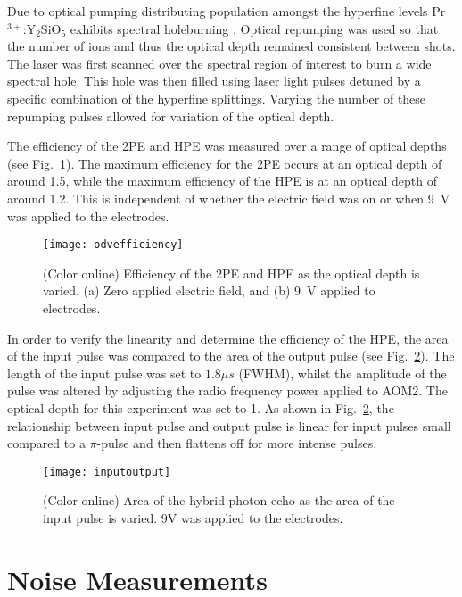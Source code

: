                                                                                                                                                                                                                                                                                                                                                                                                                                                                                                                                                                                                                                                                                                                                                                                                                                                                                                                                                                                                                                                                                                                                                                                                                                                                                                                                                                                                                                                                                                                                                                                                                                                                                                                                                                                                                                                                                                                                                                                                                                                                                                                                                                                                                                                                                                                                                                                                                                                                                                                                                                                                                                                                                                                                                                                                                                                                                                                                                                                                                                                                                                                                                                                                                                                                                                                                                                                                                                                                                                                                                                                                                                                                                                                                                                                                                                                                                                                                                                                                                                                                                                                                                                                                                                                                                                                                                                                                                                                                                                                                                                                                                                                                                                                                                                                                                                                                                                                                                                                                                                                                                                                                                                                                                                                                                                                                                                                                                                                                                                                                                                                                                                                                                                                                                                                                                                                                                                                                                                                                                                                                                                                                                                                                                                                                                                                                                                                                                                                                                                                                                                                                                                                                                                                                                                                                                                                                                                                                                                                                                                                                                                                                                                                                                                                                                                                                                                                                                                                                                                                                                                                                                                                                                                                                                                                                                                                                                                                                                                                                                                                                                                                                                                                                                                                                                                                                                                                                                                                                                                                                                                                                                                                                                                                                                                                                                                                                                                                                                                                                                                                                                                                                                                                                                                                                                                                                                                                                                                                                                                                                                                                                                                                                                                                                                                                                                                                                                                                                                                                                                                                                                                                                                                                                                                                                                                                                                                                                                                                                                                                                                                                                                                                                                                                                                                                                                                                                                                                                                                                                                                                                                                                                                                                                                                                                                                                                                                                                                                                                                                                                                                                                                                                                                                                                                                                                                                                                                                                                                                                                                                                                                                                                                                                                                                                                                                                                                                                                                                                                                                                                                                                                                                                                                                                                                                                                                                                                                                                                                                                                                                                                                                                                                                                                                                                                                                                                                                                                                                                                                                                                                                                                                                                                                                                                                                                                                                                                                                                                                                                                                                                                                                                                                                                                                                                                                                                                                                                                                                                                                                                                                                                                                                                                                                                                                                                                                                                                                                                                                                                                                                                                                                                                                                                                                                                                                                                                                                                                                                                                                                                                                                                                                                                                                                                                                                                                                                                                                                                                                                                                                                                                                                                                                                                                                                                                                                                                                                                                                                                                                                                                                                                                                                                                                                                                                                                                                                                                                                                                                                                                                                                                                                                                                                                                                                                                                                                                                                                                                                                                                                                                                                                                                                                                                                                                                                                                                                                                                                                                                                                                                                                                                                                                                                                                                                                                                                                                                                                                                                                                                                                                                                                                                                                                                                                                                                                                                                                                                                                                                                                                                                                                                                                                                                                                                                                                                                                                                                                                                                                                                                                                                                                                                                                                                                                                                                                                                                                                                                                                                                                                                                                                                                                                                                                                                                                                                                                                                                                                                                                                                                                                                                                                                                                                                                                                                                                                                                                                                                                                                                                                                                                                                                                                                                                                                                                                                                                                                                                                                                                                                                                                                                                                                                                                                                                                                                                                                                                                                                                                                                                                                                                                                                                                                                                                                                                                                                                                                                                                                                                                                                                                                                                                                                                                                                                                                                                                                                                                                                                                                                                                                                                                                                                                                                                                                                                                                                                                                                                                                                                                                                                                                                                                                                                                                                                                                                                                                                                                                                                                                                                                                                                                                                                                                                                                                                                                                                                                                                                                                                                                                                                                                                                                                                                                                                                                                                                                                                                                                                                                                                                                                                                                                                                                                                                                                                                                                                                                                                                                                                                                                                                                                                                                                                                                                                                                                                                                                                                                                                                                                                                                                                                                                                                                                                                                                                                                                                                                                                                                                                                                                                                                                                                                                                                                                                                                                                                                                                                                                                                                                                                                                                                                                                                                                                                                                                                                                                                                                                                                                                                                                                                                                                                                                                                                                                                                                                                                                                                                                                                                                                                                                                                                                                                                                                                                                                                                                                                                                                                                                                                                                                                                                                                                                                                                                                                                                                                                                                                                                                                                                                                                                                                                                                                                                                                                                                                                                                                                                                                                                                                                                                                                                                                                                                                                                                                                                                                                                                                                                                                                                                                                                                                                                                                                                                                                                                                                                                                                                                                                                                                                                                                                                                                                                                                                                                                                                                                                                                                                                                                                                                                                                                                                                                                                                                                                                                                                                                                                                                                                                                                                                                                                                                                                                                                                                                                                                                                                                                                                                                                                                                                                                                                                                                                                                                                                                                                                                                                                                                                                                                                                                                                                                                                                                                                                                                                                                                                                                                                                                                                                                                                                                                                                                                                                                                                                                                                                                                                                                                                                                                                                                                                                                                                                                                                                                                                                                                                                                                                                                                                                                                                                                                                                                                                                                                                                                                                                                                                                                                                                                                                                                                                                                                                                                                                                                                                                                                                                                                                                                                                                                                                                                                                                                                                                                                                                                                                                                                                                                                                                                                                                                                                                                                                                                                                                                                                                                                                                                                                                                                                                                                                                                                                                                                                                                                                                                                                                                                                                                                                                                                                                                                                                                                                                                                                                                                                                                                                                                                                                                                                                                                                                                                                                                                                                                                                                                                                                                                                                                                                                                                                                                                                                                                                                                                                                                                                                                                                                                                                                                                                                                                                                                                                                                                                                                                                                                                                                                                                                                                                                                                                                                                                                                                                                                                                                                                                                                                                                                                                                                                                                                                                                                                                                                                                                                                                                                                                                                                                                                                                                                                                                                                                                                                                                                                                                                                                                                                                                                                                                                                                                                                                                                                                                                                                                                                                                                                                                                                                                                                                                                                                                                                                                                                                                                                                                                                                                                                                                                                                                                                                                                                                                                                                                                                                                                                                                                                                                                                                                                                                                                                                                                                                                                                                                                                                                                                                                                                                                                                                                                                                                                                                                                                                                                                                                                                                                                                                                                                                                                                                                                                                                                                                                                                                                                                                                                                                                                                                                                                                                                                                                                                                                                                                                                                                                                                                                                                                                                                                                                                                                                                                                                                                                                                                                                                                                                                                                                                                                                                                                                                                                                                                                                                                                                                                                                                                                                                                                                                                                                                                                                                                                                                                                                                                                                                                                                                                                                                                                                                                                                                                                                                                                                                                                                                                                                                                                                                                                                                                                                                                                                                                                                                                                                                                                                                                                                                                                                                                                                                                                                                                                                                                                                                                                                                                                                                                                                                                                                                                                                                                                                                                                                                                                                                                                                                                                                                                                                                                                                                                                                                                                                                                                                                                                                                                                                                                                                                                                                                                                                                                                                                                                                                                                                                                                                                                                                                                                                                                                                                                                                                                                                                                                                                                                                                                                                                                                                                                                                                                                                                                                                                                                                                                                                                                                                                                                                                                                                                                                                                                                                                                                                                                                                                                                                                                                                                                                                                                                                                                                                                                                                                                                                                                                                                                                                                                                                                                                                                                                                                                                                                                                                                                                                                                                                                                                                                                                                                                                                                                                                                                                                                                                                                                                                                                                                                                                                                                                                                                                                                                                                                                                                                                                                                                                                                                                                                                                                                                                                                                                                                                                                                                                                                                                                                                                                                                                                                                                                                                                                                                                                                                                                                                    \documentclass[superscriptaddress,pra,twocolumn,showpacs,amsmath,amssymb,aps,a4paper]{revtex4}
\newcommand{\PRYSO}{Pr$^{3+}$:Y$_2$SiO$_5$ }
\begin{document}
Due to optical pumping distributing population amongst the hyperfine
levels \PRYSO exhibits spectral holeburning \cite{holi93}. Optical
repumping was used so that the number of ions and thus the optical
depth remained consistent between shots. The laser was first scanned over the spectral region of
interest to burn a wide spectral hole. This hole was then filled 
using laser light pulses detuned by a specific combination of the hyperfine
splittings. Varying the number of these repumping pulses allowed for
variation of the optical depth.

The efficiency of the 2PE and HPE was measured over a range of optical
depths (see Fig.~\ref{fig:odvefficiency}).
The maximum efficiency for the 2PE occurs at an optical depth of around
1.5, while the maximum efficiency of the HPE is at an optical depth
of around 1.2. This is independent of whether the electric field was on or
 %
when 9~V was applied to the electrodes.


\begin{figure}  \centering
  \texttt{[image: odvefficiency]}
\caption{\label{fig:odvefficiency} (Color online) Efficiency of the 2PE and HPE as the optical depth is varied. (a) Zero applied electric field, and (b) 9~V applied to electrodes. }
\end{figure}

In order to verify the linearity and determine the efficiency of the
HPE, the area of the input pulse was compared to the area of the
output pulse (see Fig.~\ref{fig:inputoutput}).  The length of the
input pulse was set to $1.8\mu s$ (FWHM), whilst the amplitude of the
pulse was altered by adjusting the radio frequency power applied to
AOM2.  The optical depth for this experiment was set to 1. As shown in
Fig.~\ref{fig:inputoutput}, the relationship between input pulse and
output pulse is linear for input pulses small compared to a $\pi$-pulse 
and then flattens off for more intense pulses.

\begin{figure}[t]
  \centering
  \texttt{[image: inputoutput]}
\caption{\label{fig:inputoutput} (Color online) Area of the hybrid photon echo as the area of the input pulse is varied. 9V was applied to the electrodes.}
\end{figure}



\section{Noise Measurements}
\end{document}
